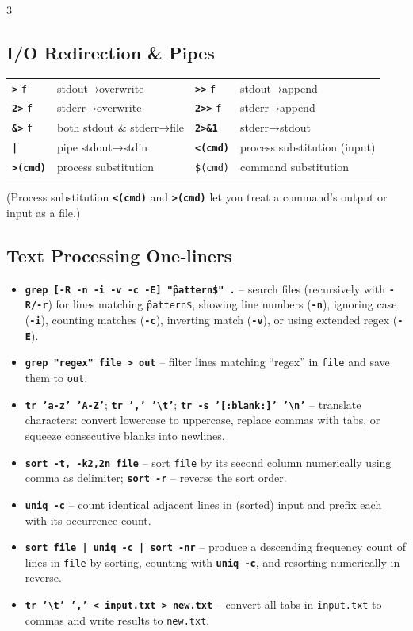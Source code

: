 \documentclass[6pt,landscape]{article}
\newcommand{\cmd}[1]{\textbf{\texttt{\textcolor{cmdcolor}{#1}}}}
\begin{document}
\begin{multicols}{3}
\subsection{I/O Redirection \& Pipes}\label{sec:iopipes}
\begin{tabular}{ll|ll}
\cmd{>} \texttt{f}      & stdout→overwrite   & \cmd{>>} \texttt{f}    & stdout→append       \\
\cmd{2>} \texttt{f}    & stderr→overwrite   & \cmd{2>>} \texttt{f}   & stderr→append       \\
\cmd{\&>} \texttt{f}   & both stdout \& stderr→file & \cmd{2>\&1}      & stderr→stdout       \\
\cmd{|}                & pipe stdout→stdin  & \cmd{<(cmd)}         & process substitution (input) \\
\cmd{>(cmd)}           & process substitution & \texttt{\$(cmd)}   & command substitution\\
\end{tabular}

\noindent (Process substitution \cmd{<(cmd)} and \cmd{>(cmd)} let you treat a command’s output or input as a file.)

\subsection{Text Processing One‐liners}\label{sec:textproc}
\begin{itemize}
  \item \cmd{grep [-R -n -i -v -c -E] "\^pattern\$" .} – search files (recursively with \cmd{-R/-r}) for lines matching \texttt{\^pattern\$}, showing line numbers (\cmd{-n}), ignoring case (\cmd{-i}), counting matches (\cmd{-c}), inverting match (\cmd{-v}), or using extended regex (\cmd{-E}).
  \item \cmd{grep "regex" \texttt{file} > \texttt{out}} – filter lines matching “regex” in \texttt{file} and save them to \texttt{out}.
  \item \cmd{tr 'a-z' 'A-Z'}; \cmd{tr ',' '\textbackslash t'}; \cmd{tr -s '[:blank:]' '\textbackslash n'} – translate characters: convert lowercase to uppercase, replace commas with tabs, or squeeze consecutive blanks into newlines.
  \item \cmd{sort -t, -k2,2n \texttt{file}} – sort \texttt{file} by its second column numerically using comma as delimiter; \cmd{sort -r} – reverse the sort order.
  \item \cmd{uniq -c} – count identical adjacent lines in (sorted) input and prefix each with its occurrence count.
  \item \cmd{sort \texttt{file} | uniq -c | sort -nr} – produce a descending frequency count of lines in \texttt{file} by sorting, counting with \cmd{uniq -c}, and resorting numerically in reverse.
  \item \cmd{tr '\textbackslash t' ',' < \texttt{input.txt} > \texttt{new.txt}} – convert all tabs in \texttt{input.txt} to commas and write results to \texttt{new.txt}.
\end{itemize}


\end{multicols}
\end{document}
